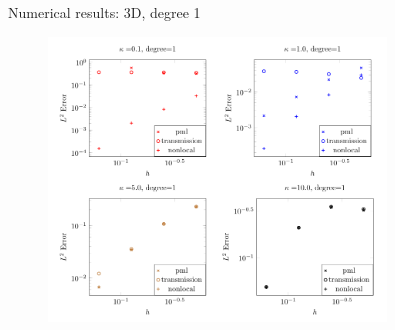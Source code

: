 \documentclass{beamer}
\begin{document}
\begin{frame}[noframenumbering]{Numerical results: 3D, degree 1}
    \begin{figure}[ht]
    \begin{center}
        \includegraphics[width=0.8\textwidth]{images/3d-accuracy.png}
    \end{center}
    \end{figure}
\end{frame}
\end{document}
